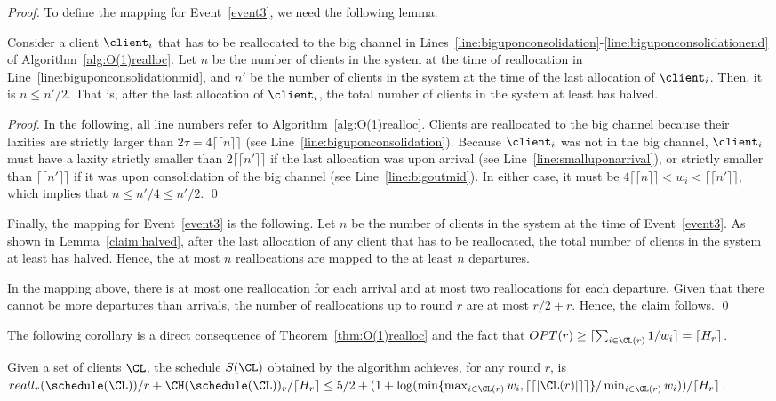 \begin{proof}
To define the mapping for Event~\ref{event3}, we need the following lemma.

\begin{lemma}
\label{claim:halved}
Consider a client $\client_i$ that has to be reallocated to the big channel in Lines~\ref{line:biguponconsolidation}-\ref{line:biguponconsolidationend} of Algorithm~\ref{alg:O(1)realloc}. 
Let $n$ be the number of clients in the system at the time of reallocation in Line~\ref{line:biguponconsolidationmid}, and
$n'$ be the number of clients in the system at the time of the last allocation of $\client_i$.
Then, it is $n\leq n'/2$.
That is, after the last allocation of $\client_i$, the total number of clients in the system at least has halved.
\end{lemma}
\begin{proof}
In the following, all line numbers refer to Algorithm~\ref{alg:O(1)realloc}.
Clients are reallocated to the big channel because their laxities are strictly larger than $2\tau = 4\lceil\lceil n \rceil\rceil$ (see Line~\ref{line:biguponconsolidation}).
Because $\client_i$ was not in the big channel, $\client_i$ must have a laxity strictly smaller than $2\lceil\lceil n' \rceil\rceil$ if the last allocation was upon arrival (see Line~\ref{line:smalluponarrival}), or strictly smaller than $\lceil\lceil n' \rceil\rceil$ if it was upon consolidation of the big channel (see Line~\ref{line:bigoutmid}). 
In either case, it must be $4\lceil\lceil n \rceil\rceil< w_i < \lceil\lceil n' \rceil\rceil$, which implies that $n\leq n'/4\leq n'/2$.
\qed\end{proof}

Finally, the mapping for Event~\ref{event3} is the following. Let $n$ be the number of clients in the system at the time of Event~\ref{event3}. As shown in Lemma~\ref{claim:halved}, after the last allocation of any client that has to be reallocated, the total number of clients in the system at least has halved. Hence, the at most $n$ reallocations are mapped to the at least $n$ departures.

In the mapping above, there is at most one reallocation for each arrival and at most two reallocations for each departure. Given that there cannot be more departures than arrivals, the number of reallocations up to round $r$ are at most $r/2+r$. Hence, the claim follows.
\qed\end{proof}



The following corollary is a direct consequence of Theorem~\ref{thm:O(1)realloc} and the fact that $OPT(r)\geq\lceil\sum_{i\in \CL(r)} 1/w_i\rceil=\lceil H_r \rceil$.

\begin{corollary}
\label{corollary}
Given a set of clients $\CL$, the schedule $S(\CL)$ obtained by the \constant algorithm achieves, for any round $r$, is
$ reall_r(\schedule(\CL))/r + \CH(\schedule(\CL))_r/\lceil H_r \rceil \leq 
5/2 + (1+\log(\min\{\max_{i\in\CL(r)}w_i,\lceil\lceil |\CL(r)|\rceil\rceil\}/\min_{i\in\CL(r)}w_i))/\lceil H_r \rceil$.
\end{corollary}




